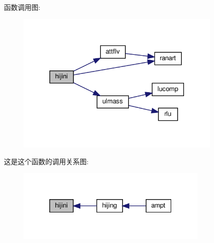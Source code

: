 函数调用图\+:
\nopagebreak
\begin{figure}[H]
\begin{center}
\leavevmode
\includegraphics[width=284pt]{hijini_8f90_a99d63cd31d2901e4fc2a3f4b5f6bfa5a_cgraph}
\end{center}
\end{figure}
这是这个函数的调用关系图\+:
\nopagebreak
\begin{figure}[H]
\begin{center}
\leavevmode
\includegraphics[width=265pt]{hijini_8f90_a99d63cd31d2901e4fc2a3f4b5f6bfa5a_icgraph}
\end{center}
\end{figure}
